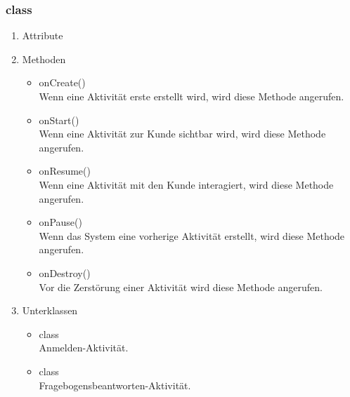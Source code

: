 \documentclass[a4paper]{scrreprt}
\begin{document}
{                \subsubsection{class }
                \begin{enumerate}
                        \item Attribute
                        \item Methoden
                            \begin{itemize}
                                \item {\large onCreate()}\\
                                Wenn eine Aktivität erste erstellt wird, wird diese Methode angerufen.
                                \item {\large onStart()}\\
                                Wenn eine Aktivität zur Kunde sichtbar wird, wird diese Methode angerufen.
                                \item {\large onResume()}\\
                                Wenn eine Aktivität mit den Kunde  interagiert, wird diese Methode angerufen.
                                \item {\large onPause()}\\
                                Wenn das System eine vorherige Aktivität erstellt, wird diese Methode angerufen.
                                \item {\large onDestroy()}\\
                                Vor die Zerstörung einer Aktivität wird diese Methode angerufen.
                            \end{itemize}
                        \item Unterklassen
                            \begin{itemize}
                                \item {\large class }\\
                                Anmelden-Aktivität.
                                \item {\large class }\\
                                Fragebogensbeantworten-Aktivität.
                            \end{itemize}


\end{enumerate}}
\end{document}
